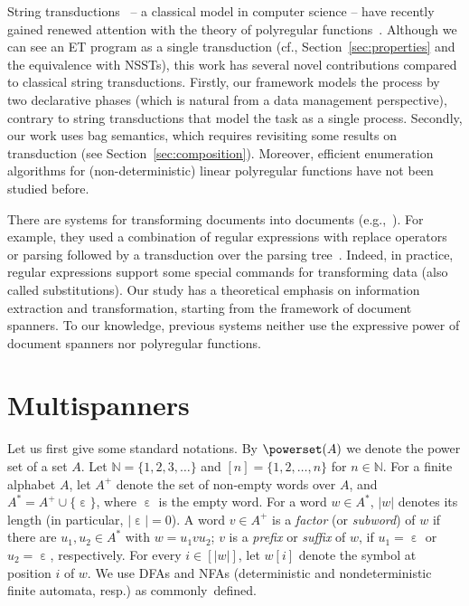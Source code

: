 \documentclass[
a4paper
]{article}
\theoremstyle{plain}
\theoremstyle{definition}
\theoremstyle{remark}
\DeclareMathOperator{\eword}{\varepsilon}
\begin{document}
String transductions~\cite{berstel2013transductions,MuschollP19,Bojanczyk22} --
a classical model 
in computer science -- have recently gained renewed
attention with the theory of polyregular functions~\cite{dagstuhlreport}. Although we can see an ET program as a single transduction (cf., Section~\ref{sec:properties} and the equivalence with NSSTs), this work has several novel contributions compared to
classical string transductions. Firstly, our framework models the process by two declarative phases (which is natural from a data management perspective), contrary to string transductions that model the task as a single process. Secondly, our work uses bag semantics, which requires revisiting some results on transduction (see Section~\ref{sec:composition}). Moreover, efficient enumeration algorithms for (non-deterministic) linear polyregular functions have not been studied before.

There are systems for transforming documents into documents (e.g.,~\cite{FASTUS}). For example, they used a combination of regular expressions with replace operators~\cite{karttunen1997replace} or parsing followed by a transduction over the parsing tree~\cite{FASTUS}. Indeed, in practice, regular expressions
support some special commands for transforming data (also called substitutions). Our study has a theoretical emphasis on information extraction and transformation, starting from the framework of document spanners. To our knowledge, previous systems neither use the expressive power of document spanners nor polyregular functions.   
 
\section{Multispanners}\label{sec:multispanners}
	
Let us first give some standard notations. By $\powerset(A)$ we denote the power set of a set $A$. Let $\mathbb{N} = \{1, 2, 3, \ldots\}$ and $[n] = \{1, 2, \ldots, n\}$ for $n \in \mathbb{N}$. For a finite alphabet $A$, let $A^+$ denote the set of non-empty words over $A$, and $A^* = A^+ \cup \{\eword\}$, where $\eword$ is the empty word. For a word $w \in A^*$, $|w|$ denotes its length (in particular, $|\eword| = 0$). A word $v \in A^+$ is a \emph{factor} (or \emph{subword}) of $w$ if there are $u_1, u_2 \in A^*$ with $w = u_1 v u_2$; $v$ is a \emph{prefix} or \emph{suffix} of $w$, if $u_1 = \eword$ or $u_2 = \eword$, respectively. For every $i \in [|w|]$, let $w[i]$ denote the symbol at position $i$ of $w$. We use DFAs and NFAs (deterministic and nondeterministic finite automata, resp.) as commonly~defined.
\end{document}
